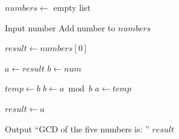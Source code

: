 \begin{algorithm}
\caption{Find GCD of Five Numbers}
\begin{algorithmic}[1]

\STATE $numbers \gets$ empty list

    \STATE Input number
    \STATE Add number to $numbers$
\ENDFOR

\STATE $result \gets numbers[0]$


    \STATE $a \gets result$
    \STATE $b \gets num$

        \STATE $temp \gets b$
        \STATE $b \gets a \bmod b$
        \STATE $a \gets temp$
    \ENDWHILE

    \STATE $result \gets a$

\ENDFOR

\STATE Output ``GCD of the five numbers is: '' $result$

\end{algorithmic}
\end{algorithm}